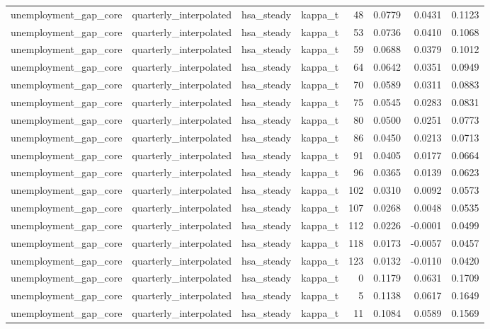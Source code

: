 \begin{tabular}{llllrrrr}
unemployment\_gap\_core & quarterly\_interpolated & hsa\_steady & kappa\_t & 48 & 0.0779 & 0.0431 & 0.1123 \\
unemployment\_gap\_core & quarterly\_interpolated & hsa\_steady & kappa\_t & 53 & 0.0736 & 0.0410 & 0.1068 \\
unemployment\_gap\_core & quarterly\_interpolated & hsa\_steady & kappa\_t & 59 & 0.0688 & 0.0379 & 0.1012 \\
unemployment\_gap\_core & quarterly\_interpolated & hsa\_steady & kappa\_t & 64 & 0.0642 & 0.0351 & 0.0949 \\
unemployment\_gap\_core & quarterly\_interpolated & hsa\_steady & kappa\_t & 70 & 0.0589 & 0.0311 & 0.0883 \\
unemployment\_gap\_core & quarterly\_interpolated & hsa\_steady & kappa\_t & 75 & 0.0545 & 0.0283 & 0.0831 \\
unemployment\_gap\_core & quarterly\_interpolated & hsa\_steady & kappa\_t & 80 & 0.0500 & 0.0251 & 0.0773 \\
unemployment\_gap\_core & quarterly\_interpolated & hsa\_steady & kappa\_t & 86 & 0.0450 & 0.0213 & 0.0713 \\
unemployment\_gap\_core & quarterly\_interpolated & hsa\_steady & kappa\_t & 91 & 0.0405 & 0.0177 & 0.0664 \\
unemployment\_gap\_core & quarterly\_interpolated & hsa\_steady & kappa\_t & 96 & 0.0365 & 0.0139 & 0.0623 \\
unemployment\_gap\_core & quarterly\_interpolated & hsa\_steady & kappa\_t & 102 & 0.0310 & 0.0092 & 0.0573 \\
unemployment\_gap\_core & quarterly\_interpolated & hsa\_steady & kappa\_t & 107 & 0.0268 & 0.0048 & 0.0535 \\
unemployment\_gap\_core & quarterly\_interpolated & hsa\_steady & kappa\_t & 112 & 0.0226 & -0.0001 & 0.0499 \\
unemployment\_gap\_core & quarterly\_interpolated & hsa\_steady & kappa\_t & 118 & 0.0173 & -0.0057 & 0.0457 \\
unemployment\_gap\_core & quarterly\_interpolated & hsa\_steady & kappa\_t & 123 & 0.0132 & -0.0110 & 0.0420 \\
unemployment\_gap\_core & quarterly\_interpolated & hsa\_steady & kappa\_t & 0 & 0.1179 & 0.0631 & 0.1709 \\
unemployment\_gap\_core & quarterly\_interpolated & hsa\_steady & kappa\_t & 5 & 0.1138 & 0.0617 & 0.1649 \\
unemployment\_gap\_core & quarterly\_interpolated & hsa\_steady & kappa\_t & 11 & 0.1084 & 0.0589 & 0.1569 \\

\end{tabular}
